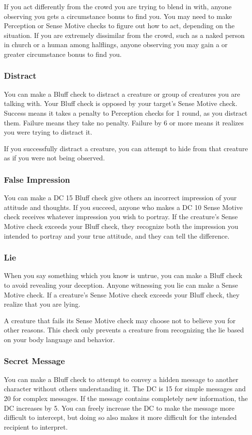 If you act differently from the crowd you are trying to blend in with, anyone observing you gets a  circumstance bonus to find you. You may need to make Perception or Sense Motive checks to figure out how to act, depending on the situation. If you are extremely dissimilar from the crowd, such as a naked person in church or a human among halflings, anyone observing you may gain a  or greater circumstance bonus to find you. 

\subsubsection{Distract}
You can make a Bluff check to distract a creature or group of creatures you are talking with. Your Bluff check is opposed by your target's Sense Motive check. Success means it takes a  penalty to Perception checks for 1 round, as you distract them. Failure means they take no penalty. Failure by 6 or more means it realizes you were trying to distract it.

If you successfully distract a creature, you can attempt to hide from that creature as if you were not being observed.

\subsubsection{False Impression}
You can make a DC 15 Bluff check give others an incorrect impression of your attitude and thoughts. If you succeed, anyone who makes a DC 10 Sense Motive check receives whatever impression you wish to portray. If the creature's Sense Motive check exceeds your Bluff check, they recognize both the impression you intended to portray and your true attitude, and they can tell the difference.

\subsubsection{Lie}
When you say something which you know is untrue, you can make a Bluff check to avoid revealing your deception. Anyone witnessing you lie can make a Sense Motive check. If a creature's Sense Motive check exceeds your Bluff check, they realize that you are lying.

A creature that fails its Sense Motive check may choose not to believe you for other reasons. This check only prevents a creature from recognizing the lie based on your body language and behavior.

\subsubsection{Secret Message}
You can make a Bluff check to attempt to convey a hidden message to another character without others understanding it. The DC is 15 for simple messages and 20 for complex messages. If the message contains completely new information, the DC increases by 5. You can freely increase the DC to make the message more difficult to intercept, but doing so also makes it more difficult for the intended recipient to interpret.

